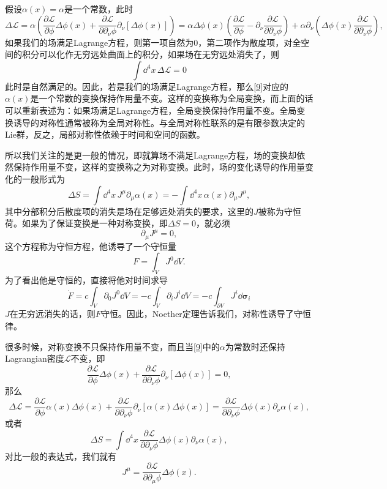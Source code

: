 \documentclass[9pt]{extbook}
\begin{document}
假设$\alpha(x)=\alpha$是一个常数，此时
\[
	\Delta\mathcal{L}=\alpha\left(\frac{\partial \mathcal{L}}{\partial \phi}\Delta\phi(x)+\frac{\partial \mathcal{L}}{\partial \partial_\nu\phi}\partial_\nu[\Delta\phi(x)]\right)=\alpha\Delta\phi(x)\left(\frac{\partial \mathcal{L}}{\partial \phi}-\partial_\nu\frac{\partial \mathcal{L}}{\partial \partial_\nu\phi}\right)+\alpha\partial_\nu\left(\Delta\phi(x)\frac{\partial \mathcal{L}}{\partial \partial_\nu\phi}\right),
\]
如果我们的场满足Lagrange方程，则第一项自然为$0$，第二项作为散度项，对全空间的积分可以化作无穷远处曲面上的积分，如果场在无穷远处消失了，则
\[
	\int\dd^4x\,\Delta\mathcal{L}=0
\]
此时是自然满足的。因此，若是我们的场满足Lagrange方程，那么\eqref{9}对应的$\alpha(x)$是一个常数的变换保持作用量不变。这样的变换称为全局变换，而上面的话可以重新表述为：如果场满足Lagrange方程，全局变换保持作用量不变。全局变换诱导的对称性通常被称为全局对称性。与全局对称性联系的是有限参数决定的Lie群，反之，局部对称性依赖于时间和空间的函数。

所以我们关注的是更一般的情况，即就算场不满足Lagrange方程，场的变换却依然保持作用量不变，这样的变换称之为对称变换。此时，场的变化诱导的作用量变化的一般形式为
\begin{equation}
	\Delta S=\int\dd^4x\,J^\mu\partial_\mu \alpha(x)=-\int\dd^4x\,\alpha(x)\partial_\mu J^\mu,
	\label{dS}
\end{equation}
其中分部积分后散度项的消失是场在足够远处消失的要求，这里的$J$被称为守恒荷。如果为了保证变换是一种对称变换，即$\Delta S=0$，就必须
\[
	\partial_\mu J^\mu=0,
\]
这个方程称为守恒方程，他诱导了一个守恒量
\[
	F=\int_{V} J^0 \dd V.
\]
为了看出他是守恒的，直接将他对时间求导
\[
	\dot{F}=c\int_{V} \partial_0J^0 \dd V=-c\int_{V} \partial_iJ^i \dd V=-c\int_{\partial V}J^i \dd \bm{\sigma}_i
\]
$J$在无穷远消失的话，则$F$守恒。因此，Noether定理告诉我们，对称性诱导了守恒律。

很多时候，对称变换不只保持作用量不变，而且当\eqref{9}中的$\alpha$为常数时还保持Lagrangian密度$\mathcal{L}$不变，即
\[
	\frac{\partial \mathcal{L}}{\partial \phi}\Delta\phi(x)+\frac{\partial \mathcal{L}}{\partial \partial_\nu\phi}\partial_\nu[\Delta\phi(x)]=0,
\]
那么
\[
	\Delta\mathcal{L}=\frac{\partial \mathcal{L}}{\partial \phi}\alpha(x)\Delta\phi(x)+\frac{\partial \mathcal{L}}{\partial \partial_\nu\phi}\partial_\nu[\alpha(x)\Delta\phi(x)]=\frac{\partial \mathcal{L}}{\partial \partial_\nu\phi}\Delta\phi(x)\partial_\nu\alpha(x),
\]
或者
\[
	\Delta S=\int\dd^4 x\,\frac{\partial \mathcal{L}}{\partial \partial_\nu\phi}\Delta\phi(x)\partial_\nu\alpha(x),
\]
对比一般的表达式，我们就有
\[
	J^\mu=\frac{\partial \mathcal{L}}{\partial \partial_\mu\phi}\Delta\phi(x).
\]
\end{document}
